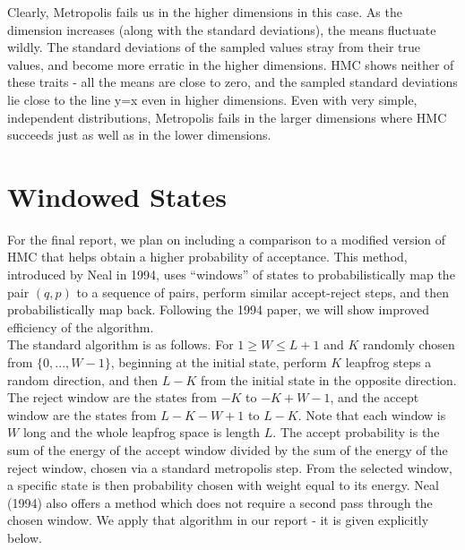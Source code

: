 \documentclass{article}
\numberwithin{equation}{section}
\begin{document}
Clearly, Metropolis fails us in the higher dimensions in this case. As the dimension increases (along with the standard deviations), the means fluctuate wildly. The standard deviations of the sampled values stray from their true values, and become more erratic in the higher dimensions. HMC shows neither of these traits - all the means are close to zero, and the sampled standard deviations lie close to the line y=x even in higher dimensions. Even with very simple, independent distributions, Metropolis fails in the larger dimensions where HMC succeeds  just as well as in the lower dimensions. 

\section{Windowed States}
For the final report, we plan on including a comparison to a modified version of HMC that helps obtain a higher probability of acceptance. This method, introduced by Neal in 1994, uses ``windows'' of states to probabilistically map the pair $(q,p)$ to a sequence of pairs, perform similar accept-reject steps, and then probabilistically map back. Following the 1994 paper, we will show improved efficiency of the algorithm.\\

The standard algorithm is as follows. For $1 \geq W \leq L + 1$ and $K$ randomly chosen from $\{0,...,W-1\}$, beginning at the initial state, perform $K$ leapfrog steps a random direction, and then $L - K$ from the initial state in the opposite direction. The reject window are the states from $-K$ to $-K + W - 1$, and the accept window are the states from $L-K-W+1$ to $L-K$. Note that each window is $W$ long and the whole leapfrog space is length $L$. The accept probability is the sum of the energy of the accept window divided by the sum of the energy of the reject window, chosen via a standard metropolis step. From the selected window, a specific state is then probability chosen with weight equal to its energy. Neal (1994) also offers a method which does not require a second pass through the chosen window. We apply that algorithm in our report - it is given explicitly below.\\
\end{document}
